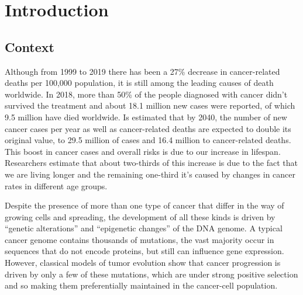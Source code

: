 


\chapter{Introduction}
\label{cha:introduction} 

\begin{comment}
\epigraphfontsize{\small\itshape}
\setlength\epigraphwidth{12.5cm}
\setlength\epigraphrule{0pt}

\epigraph{
  This work is licensed under the \href{LaTeX project public license}{\LaTeX\ Project Public License v1.3c}.
  To view a copy of this license, visit \url{LaTeX project public license}.
}
\end{comment}

\section{Context}
\label{context}
\hspace{10px}Although from 1999 to 2019 there has been a 27\% decrease in cancer-related deaths per 100,000 population, it is still among the leading causes of death worldwide. In 2018, more than 50\% of the people diagnosed with cancer didn't survived the treatment and about 18.1 million new cases were reported, of which 9.5 million have died %
worldwide. Is estimated that by 2040, the number of new cancer cases per year as well as cancer-related deaths are expected to double its original value, to 29.5 million of cases and 16.4 million to cancer-related deaths. This boost in cancer cases and  overall risks is due to our increase in lifespan. Researchers estimate that about two-thirds of this increase is due to the fact that we are living longer and the remaining one-third it's caused by changes in cancer rates in different age groups.

Despite the presence of more than one type of cancer that differ in the way of growing cells and spreading, the development of all these kinds is driven by “genetic alterations” and “epigenetic changes” of the DNA genome\cite{Herceg}. A typical cancer genome contains thousands of mutations, the vast majority occur in sequences that do not encode proteins, but still can influence gene expression. However, classical models of tumor evolution show that cancer progression is driven by only a few of these mutations, which are under strong \gls{positive selection} and so making them preferentially maintained in the cancer-cell population. 

